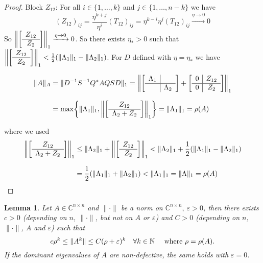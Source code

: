\documentclass[12pt]{article}
\newtheorem{lemma}[theorem]{Lemma}
\theoremstyle{definition}
\theoremstyle{remark}
\numberwithin{equation}{section}
\newcommand{\C}{\mathbb{C}}
\newcommand{\N}{\mathbb{N}}
\newcommand{\normempty}{\|\cdot\|}
\newcommand{\blockVertical}[2]{
  \left[
    \begin{array}{c}
      #1\\\hline
      #2\\
    \end{array}
  \right]
}
\newcommand{\blockFull}[4]{
  \left[
    \begin{array}{c|c}
      #1 & #2\\\hline
      #3 & #4\\
    \end{array}
  \right]
}
\DeclarePairedDelimiter{\norm}{\lVert}{\rVert}
\DeclarePairedDelimiter{\set}{\{}{\}}
\begin{document}
\begin{proof}
  Block $Z_{12}$: For all $i \in \{1,\ldots,k\}$ and $j \in \{1,\ldots,n-k\}$ we have
  \begin{equation*}
    (Z_{12})_{ij} = \frac{\eta^{k+j}}{\eta^i} (T_{12})_{ij} = \eta^{k-i} \eta^{j} (T_{12})_{ij} \xrightarrow{\eta \rightarrow 0} 0
  \end{equation*}
  So $\norm*{\blockVertical{Z_{12}}{Z_2}}_1 \xrightarrow{\eta \rightarrow 0} 0$. So there exists $\eta_* > 0$ such that $\norm*{\blockVertical{Z_{12}}{Z_2}}_1 < \frac{1}{2}(\norm{\Lambda_1}_1 - \norm{\Lambda_2}_1)$. For $D$ defined with $\eta = \eta_*$ we have

  \begin{align*}
    \norm{A}_A &= \norm{D^{-1}S^{-1}Q^*AQSD}_1 = \norm*{\blockFull{\Lambda_1}{}{}{\Lambda_2} + \blockFull{0}{Z_{12}}{0}{Z_2}}_1 \\[0.5\baselineskip]
    &= \max\set*{{\norm{\Lambda_1}_1, \norm*{\blockVertical{Z_{12}}{\Lambda_2 + Z_2}}_1}} = \norm{\Lambda_1}_1 = \rho(A)
  \end{align*}

  where we used
  \begin{align*}
    \norm*{\blockVertical{Z_{12}}{\Lambda_2 + Z_2}}_1 &\leq \norm{\Lambda_2}_1 + \norm*{\blockVertical{Z_{12}}{Z_2}}_1 < \norm{\Lambda_2}_1 + \frac{1}{2}(\norm{\Lambda_1}_1 - \norm{\Lambda_2}_1) \\[0.5\baselineskip]
    &= \frac{1}{2}(\norm{\Lambda_1}_1 + \norm{\Lambda_2}_1) < \norm{\Lambda_1}_1 = \norm{\Lambda}_1=\rho(A)
  \end{align*}
\end{proof}

\begin{lemma}
  Let $A \in \C^{n\times n}$ and $\normempty$ be a norm on $\C^{n\times n},\ \varepsilon>0$, then there exists $c>0$ (depending on $n$, $\normempty$, but not on $A$ or $\varepsilon$) and $C>0$ (depending on $n$, $\normempty$, $A$ and $\varepsilon$) such that
  \begin{equation*}
    c \rho^k \leq \norm{A^k} \leq C (\rho + \varepsilon)^k \quad \forall k \in \N \quad \text{  where $\rho = \rho(A)$.}
  \end{equation*}
  If the dominant eigenvalues of $A$ are non-defective, the same holds with $\varepsilon = 0$.
\end{lemma}
\end{document}
